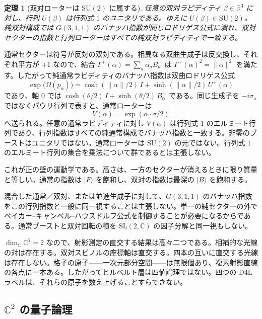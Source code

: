 \documentclass[a4paper]{article}
\newtheorem{theorem}{定理}[section]
\theoremstyle{definition}
\begin{document}
\begin{theorem}[双対ローターは \(\mathrm{SU}(2)\) に属する]
\label{thm:su2}
任意の双対ラピディティ \(\beta\in\mathbb{R}^3\) に対し、行列 \(U(\beta)\) は行列式 \(1\) のユニタリである。ゆえに \(U(\beta)\in\mathrm{SU}(2)\)。純双対構成では \(G(3,1,1)\) のバナッハ指数が同じロドリゲス公式に潰れ、双対セクターの指数と行列ローターはすべての純双対ラピディティで一致する。
\end{theorem}

通常セクターは符号が反対の双対である。相異なる双曲生成子は反交換し、それぞれ平方が \(+1\) なので、結合 \(\Gamma^+(\alpha)=\sum_a\alpha_a B^+_a\) は \(\Gamma^+(\alpha)^2=\lVert\alpha\rVert^2\) を満たす。したがって純通常ラピディティのバナッハ指数は双曲ロドリゲス公式
\[
\exp\bigl(\Omega(p_\alpha)\bigr)
=\cosh(\lVert\alpha\rVert/2)\,I
+\sinh(\lVert\alpha\rVert/2)\,U^+(\alpha)
\]
であり、軸 \(0\) では \(\cosh(\theta/2)\,I+\sinh(\theta/2)\,B^+_0\) である。同じ生成子を \(-i\sigma_a\) ではなくパウリ行列で表すと、通常ローターは
\[
V(\alpha)=\exp(\alpha\cdot\sigma/2)
\]
へ送られる。任意の通常ラピディティに対し \(V(\alpha)\) は行列式 \(1\) のエルミート行列であり、行列指数はすべての純通常構成でバナッハ指数と一致する。非零のブーストはユニタリではない。通常ローターは \(\mathrm{SU}(2)\) の元ではない。行列式 \(1\) のエルミート行列の集合を乗法について群であるとは主張しない。

これが正の壁の運動学である。高さは、一方のセクターが消えるときに限り質量と等しい。通常の指数は \(\lvert F\rangle\) を飽和し、双対の指数は最深の \(\lvert B\rangle\) を飽和する。

混合した通常／双対、または並進生成子に対して、\(G(3,1,1)\) のバナッハ指数をこの行列指数と一般に同一視することは主張しない。単一の純セクターの外でベイカー--キャンベル--ハウスドルフ公式を制御することが必要になるからである。通常ブーストと双対回転の積を \(\mathrm{SL}(2,\mathbb{C})\) の因子分解と同一視もしない。

\(\dim_{\mathbb{C}}\mathbb{C}^2=2\) なので、射影測定の直交する結果は高々二つである。相補的な光線の対は存在する。双対スピノルの座標軸は直交する。四本の互いに直交する光線は存在しない。格子の原子——一次元部分空間——は無限個あり、複素射影直線の各点に一本ある。したがってヒルベルト層は四値論理ではない。四つの D4L ラベルは、それらの原子を数え上げることすらできない。

\subsection[C2 の量子論理]{\(\mathbb{C}^2\) の量子論理}
\label{sec:ql}
\end{document}

